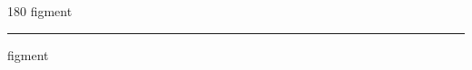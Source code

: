 
\begin{frame}
\begin{center}
\begin{turn}{180}
{\fontsize{2.5cm}{1em}\selectfont figment}
\end{turn}
\vspace{1em}\par  
\hrule
\vspace{1em}\par  
{\fontsize{2.5cm}{1em}\selectfont figment}
\end{center}
\end{frame}
